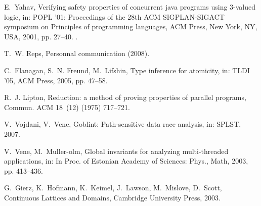 \documentclass[12pt]{article}
\begin{document}
\begin{thebibliography}{10}
E.~Yahav, Verifying safety properties of concurrent java programs using
  3-valued logic, in: POPL '01: Proceedings of the 28th ACM SIGPLAN-SIGACT
  symposium on Principles of programming languages, ACM Press, New York, NY,
  USA, 2001, pp. 27--40.
\newblock \href {http://dx.doi.org/http://doi.acm.org/10.1145/360204.360206}
  {}.

T.~W. Reps, Personnal communication (2008).

C.~Flanagan, S.~N. Freund, M.~Lifshin, Type inference for atomicity, in: TLDI
  '05, ACM Press, 2005, pp. 47--58.

R.~J. Lipton, Reduction: a method of proving properties of parallel programs,
  Commun. ACM 18~(12) (1975) 717--721.

V.~Vojdani, V.~Vene, Goblint: Path-sensitive data race analysis, in: SPLST,
  2007.

V.~Vene, M.~Muller-olm, Global invariants for analyzing multi-threaded
  applications, in: In Proc. of Estonian Academy of Sciences: Phys., Math,
  2003, pp. 413--436.

G.~Gierz, K.~Hofmann, K.~Keimel, J.~Lawson, M.~Mislove, D.~Scott, Continuous
  Lattices and Domains, Cambridge University Press, 2003.

\end{thebibliography}
\end{document}
